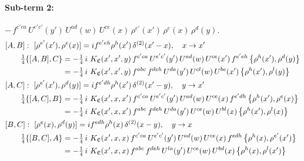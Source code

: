 \documentclass[10pt]{article}
\numberwithin{equation}{section}
\begin{document}
\paragraph{Sub-term 2:} $-\,f^{c'ca}\,U^{e'c'}(y')\,U^{ad}(w)\,U^{ce}(x)\,\rho^{e'}(x')\,\rho^{e}(x)\,\rho^{d}(y)$.
\begin{align}
&[A,B]:\ [\rho^{e'}(x'),\rho^{e}(x)]=i f^{e'eh}\rho^{h}(x')\,\delta^{(2)}(x'-x),\quad x\to x'\notag\\
&\qquad \tfrac14\{[A,B],C\}=-\tfrac14\,i\,\,K_{\mathfrak C}(x',x',y)\,f^{c'ca}\,U^{e'c'}(y')\,U^{ad}(w)\,U^{ce}(x')\,f^{e'eh}\,\big\{\rho^{h}(x'),\rho^{d}(y)\big\}\notag\\
&\qquad\phantom{\tfrac14\{[A,B],C\}}=-\tfrac14\,i\,\,K_{\mathfrak C}(x',x',y)\,f^{abc}\,f^{deh}\,U^{da}(y')\,U^{cl}(w)\,U^{be}(x')\,\big\{\rho^{h}(x'),\rho^{l}(y)\big\}
\label{R:eq:GIII.V-2-AB}\\
&[A,C]:\ [\rho^{e'}(x'),\rho^{d}(y)]=i f^{e'dh}\rho^{h}(x')\,\delta^{(2)}(x'-y),\quad y\to x'\notag\\
&\qquad \tfrac14\{[A,C],B\}=-\tfrac14\,i\,\,K_{\mathfrak C}(x',x,x')\,f^{c'ca}\,U^{e'c'}(y')\,U^{ad}(w)\,U^{ce}(x)\,f^{e'dh}\,\big\{\rho^{h}(x'),\rho^{e}(x)\big\}\notag\\
&\qquad\phantom{\tfrac14\{[A,C],B\}}=-\tfrac14\,i\,\,K_{\mathfrak C}(x',x,x')\,f^{abc}\,f^{deh}\,U^{da}(y')\,U^{ce}(w)\,U^{bl}(x)\,\big\{\rho^{h}(x'),\rho^{l}(x)\big\}
\label{R:eq:GIII.V-2-AC}\\
&[B,C]:\ [\rho^{e}(x),\rho^{d}(y)]=i f^{edh}\rho^{h}(x)\,\delta^{(2)}(x-y),\quad y\to x\notag\\
&\qquad \tfrac14\{[B,C],A\}=-\tfrac14\,i\,\,K_{\mathfrak C}(x',x,x)\,f^{c'ca}\,U^{e'c'}(y')\,U^{ad}(w)\,U^{ce}(x)\,f^{edh}\,\big\{\rho^{h}(x),\rho^{e'}(x')\big\}\notag\\
&\qquad\phantom{\tfrac14\{[B,C],A\}}=-\tfrac14\,i\,\,K_{\mathfrak C}(x',x,x)\,f^{abc}\,f^{deh}\,U^{la}(y')\,U^{ce}(w)\,U^{bd}(x)\,\big\{\rho^{h}(x),\rho^{l}(x')\big\}
\label{R:eq:GIII.V-2-BC}
\end{align}
\end{document}
